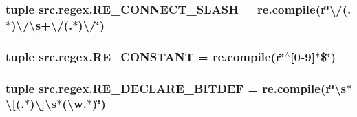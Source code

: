 \hypertarget{namespacesrc_1_1regex_a2eab5ea3af78edbe7dfd685e870f16ec}{
\subsubsection[{R\-E\-\_\-\-C\-O\-N\-N\-E\-C\-T\-\_\-\-S\-L\-A\-S\-H}]{\setlength{\rightskip}{0pt plus 5cm}tuple src.\-regex.\-R\-E\-\_\-\-C\-O\-N\-N\-E\-C\-T\-\_\-\-S\-L\-A\-S\-H = re.\-compile(r\char`\"{}\textbackslash{}/(.$\ast$)\textbackslash{}/\textbackslash{}s+\textbackslash{}/(.$\ast$)\textbackslash{}/\char`\"{})}}\label{namespacesrc_1_1regex_a2eab5ea3af78edbe7dfd685e870f16ec}
\hypertarget{namespacesrc_1_1regex_a561107014dfbb72a888014d41680fa3a}{
\subsubsection[{R\-E\-\_\-\-C\-O\-N\-S\-T\-A\-N\-T}]{\setlength{\rightskip}{0pt plus 5cm}tuple src.\-regex.\-R\-E\-\_\-\-C\-O\-N\-S\-T\-A\-N\-T = re.\-compile(r\char`\"{}$^\wedge$\mbox{[}0-\/9\mbox{]}$\ast$\$\char`\"{})}}\label{namespacesrc_1_1regex_a561107014dfbb72a888014d41680fa3a}
\hypertarget{namespacesrc_1_1regex_a5c3c7c145cdbc544029818e8dff75c1e}{
\subsubsection[{R\-E\-\_\-\-D\-E\-C\-L\-A\-R\-E\-\_\-\-B\-I\-T\-D\-E\-F}]{\setlength{\rightskip}{0pt plus 5cm}tuple src.\-regex.\-R\-E\-\_\-\-D\-E\-C\-L\-A\-R\-E\-\_\-\-B\-I\-T\-D\-E\-F = re.\-compile(r\char`\"{}\textbackslash{}s$\ast$\textbackslash{}\mbox{[}(.$\ast$)\textbackslash{}\mbox{]}\textbackslash{}s$\ast$(\textbackslash{}w.$\ast$)\char`\"{})}}\label{namespacesrc_1_1regex_a5c3c7c145cdbc544029818e8dff75c1e}
